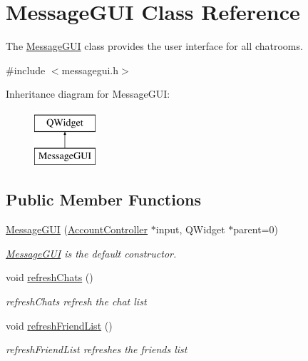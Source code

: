 \hypertarget{classMessageGUI}{}\section{Message\+G\+UI Class Reference}
\label{classMessageGUI}


The \hyperlink{classMessageGUI}{Message\+G\+UI} class provides the user interface for all chatrooms.  




{\ttfamily \#include $<$messagegui.\+h$>$}

Inheritance diagram for Message\+G\+UI\+:\begin{figure}[H]
\begin{center}
\leavevmode
\includegraphics[height=2.000000cm]{classMessageGUI}
\end{center}
\end{figure}
\subsection*{Public Member Functions}
\begin{DoxyCompactItemize}
\item 
\hyperlink{classMessageGUI_a8f9bbfc07c7f8249a7999db9c1792cf7}{Message\+G\+UI} (\hyperlink{classAccountController}{Account\+Controller} $\ast$input, Q\+Widget $\ast$parent=0)
\begin{DoxyCompactList}\small\item\em \hyperlink{classMessageGUI}{Message\+G\+UI} is the default constructor. \end{DoxyCompactList}\item 
void \hyperlink{classMessageGUI_a243667a3d45ed3c2f8feab3daf5b6fde}{refresh\+Chats} ()\hypertarget{classMessageGUI_a243667a3d45ed3c2f8feab3daf5b6fde}{}\label{classMessageGUI_a243667a3d45ed3c2f8feab3daf5b6fde}

\begin{DoxyCompactList}\small\item\em refresh\+Chats refresh the chat list \end{DoxyCompactList}\item 
void \hyperlink{classMessageGUI_ae1f45b6c794f64a7b93de9956183a324}{refresh\+Friend\+List} ()\hypertarget{classMessageGUI_ae1f45b6c794f64a7b93de9956183a324}{}\label{classMessageGUI_ae1f45b6c794f64a7b93de9956183a324}

\begin{DoxyCompactList}\small\item\em refresh\+Friend\+List refreshes the friend\textquotesingle{}s list \end{DoxyCompactList}\end{DoxyCompactItemize}


